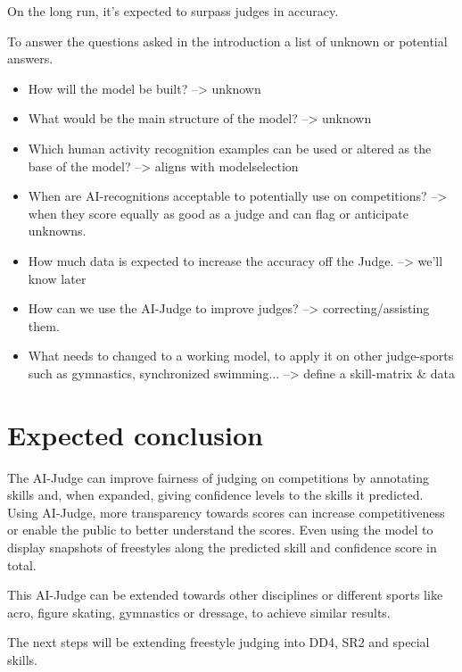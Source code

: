 On the long run, it's expected to surpass judges in accuracy.

To answer the questions asked in the introduction a list of unknown or potential answers.

\begin{itemize}
    \item How will the model be built? --> unknown
    \item What would be the main structure of the model? --> unknown
    \item Which human activity recognition examples can be used or altered as the base of the model? --> aligns with modelselection
    \item When are AI-recognitions acceptable to potentially use on competitions? --> when they score equally as good as a judge and can flag or anticipate unknowns.
    \item How much data is expected to increase the accuracy off the Judge. --> we'll know later
    \item How can we use the AI-Judge to improve judges? --> correcting/assisting them.
    \item What needs to changed to a working model, to apply it on other judge-sports such as gymnastics, synchronized swimming... --> define a skill-matrix \& data
\end{itemize}


\section{Expected conclusion}%
\label{sec:conclusion}

The AI-Judge can improve fairness of judging on competitions by annotating skills and, when expanded, giving confidence levels to the skills it predicted. Using AI-Judge, more transparency towards scores can increase competitiveness or enable the public to better understand the scores. Even using the model to display snapshots of freestyles along the predicted skill and confidence score in total.

This AI-Judge can be extended towards other disciplines or different sports like acro, figure skating, gymnastics or dressage, to achieve similar results.

The next steps will be extending freestyle judging into DD4, SR2 and special skills.
